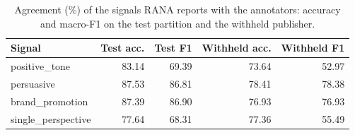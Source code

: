 \begin{table}[t]
\small
\centering
\caption{Agreement (\%) of the signals RANA reports with the annotators: accuracy and macro-F1 on the test partition and the withheld publisher.}\label{tbl_signals}
\begin{tabular*}{\tblwidth}{@{\extracolsep{\fill}}LRRRR@{}}
\toprule
\textbf{Signal} & \textbf{Test acc.} & \textbf{Test F1} & \textbf{Withheld acc.} & \textbf{Withheld F1} \\
\midrule
positive\_tone & 83.14 & 69.39 & 73.64 & 52.97 \\
persuasive & 87.53 & 86.81 & 78.41 & 78.38 \\
brand\_promotion & 87.39 & 86.90 & 76.93 & 76.93 \\
single\_perspective & 77.64 & 68.31 & 77.36 & 55.49 \\
\bottomrule
\end{tabular*}
\end{table}
